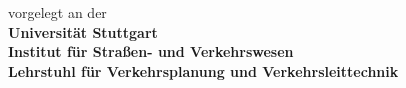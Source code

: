 \begin{titlepage}
\begin{flushleft}
\begin{minipage}{0.2\textwidth}
\begin{flushright}
	\hfill
	\end{flushright}
\end{minipage}
\begin{minipage}{0.75\textwidth}
         {\small vorgelegt an der} \\
         {\bf Universität Stuttgart} \\
         {\bf Institut für Straßen- und Verkehrswesen}\\
         {\bf Lehrstuhl für Verkehrsplanung und Verkehrsleittechnik}\\
\end{minipage}
\end{flushleft}
\end{titlepage}

\clearpage
\thispagestyle{empty}
